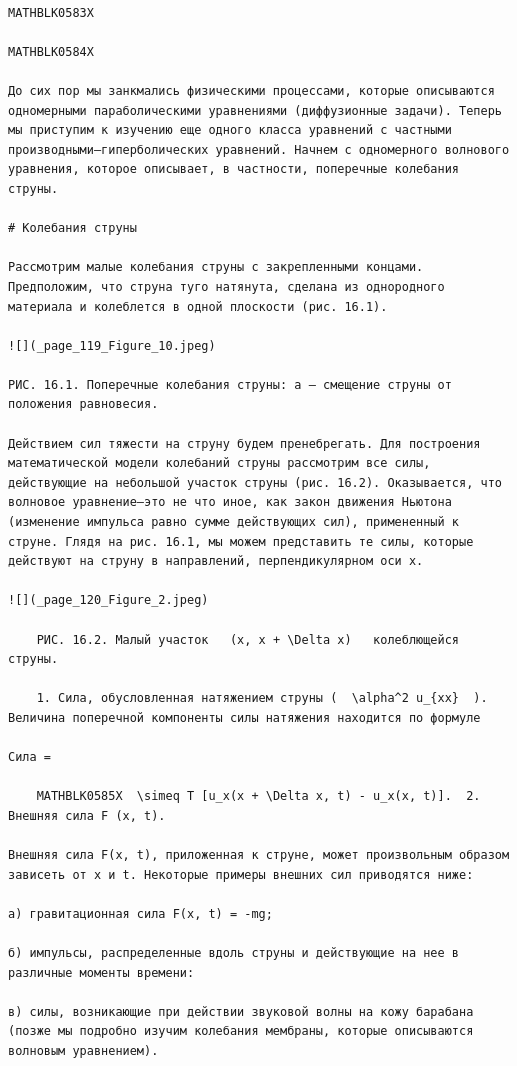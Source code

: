 \documentclass[
]{article}
\begin{document}
\begin{verbatim}

MATHBLK0583X

MATHBLK0584X

До сих пор мы занкмались физическими процессами, которые описываются одномерными параболическими уравнениями (диффузионные задачи). Теперь мы приступим к изучению еще одного класса уравнений с частными производными—гиперболических уравнений. Начнем с одномерного волнового уравнения, которое описывает, в частности, поперечные колебания струны.

# Колебания струны

Рассмотрим малые колебания струны с закрепленными концами. Предположим, что струна туго натянута, сделана из однородного материала и колеблется в одной плоскости (рис. 16.1).

![](_page_119_Figure_10.jpeg)

РИС. 16.1. Поперечные колебания струны: a — смещение струны от положения равновесия.

Действием сил тяжести на струну будем пренебрегать. Для построения математической модели колебаний струны рассмотрим все силы, действующие на небольшой участок струны (рис. 16.2). Оказывается, что волновое уравнение—это не что иное, как закон движения Ньютона (изменение импульса равно сумме действующих сил), примененный к струне. Глядя на рис. 16.1, мы можем представить те силы, которые действуют на струну в направлений, перпендикулярном оси х.

![](_page_120_Figure_2.jpeg)

    РИС. 16.2. Малый участок   (x, x + \Delta x)   колеблющейся струны.

    1. Сила, обусловленная натяжением струны (  \alpha^2 u_{xx}  ). Величина поперечной компоненты силы натяжения находится по формуле

Сила =

    MATHBLK0585X  \simeq T [u_x(x + \Delta x, t) - u_x(x, t)].  2. Внешняя сила F (x, t).

Внешняя сила F(x, t), приложенная к струне, может произвольным образом зависеть от x и t. Некоторые примеры внешних сил приводятся ниже:

а) гравитационная сила F(x, t) = -mg;

б) импульсы, распределенные вдоль струны и действующие на нее в различные моменты времени:

в) силы, возникающие при действии звуковой волны на кожу барабана (позже мы подробно изучим колебания мембраны, которые описываются волновым уравнением).


\end{verbatim}
\end{document}
